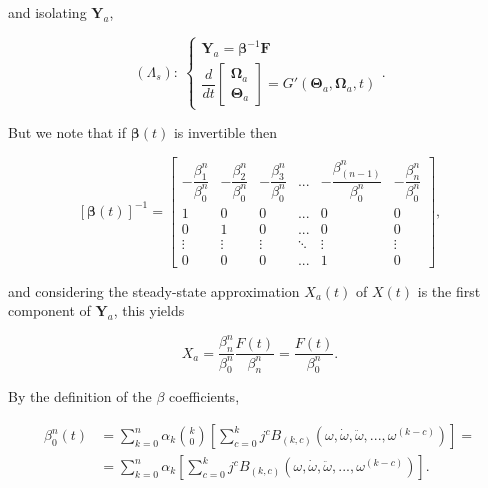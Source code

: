 	\noindent and isolating $\mathbf{Y}_a$,

\begin{equation}
	\left(\Lambda_s\right):\ \left\{\begin{array}{l} 
		\mathbf{Y}_a = \boldsymbol{\beta}^{-1} \mathbf{F} \\[3mm]
		\dfrac{d}{dt}\left[\begin{array}{c} \boldsymbol{\Omega}_a \\[3mm] \boldsymbol{\Theta}_a \end{array}\right] = G'\left(\boldsymbol{\Theta}_a, \boldsymbol{\Omega}_a, t\right)
\end{array} \right. .
\end{equation}

	But we note that if $\boldsymbol{\beta}(t)$ is invertible then

\begin{equation} \left[\boldsymbol{\beta}(t)\right]^{-1} =
\left[\begin{array}{cccccc}
- \dfrac{\beta^n_1}{\beta^n_0} & - \dfrac{\beta^n_2}{\beta^n_0} & -\dfrac{\beta^n_3}{\beta^n_0} & ... & -\dfrac{\beta^n_{(n-1)}}{\beta^n_0} & -\dfrac{\beta^n_n}{\beta^n_0} \\[3mm]
1 & 0 & 0 & ... & 0 & 0 \\[3mm]
0 & 1 & 0 & ... & 0 & 0  \\[3mm]
\vdots & \vdots & \vdots & \ddots & \vdots & \vdots \\[3mm]
0 & 0 & 0 & ... & 1 & 0
\end{array}\right] ,
\end{equation}

	\noindent and considering the steady-state approximation $X_a(t)$ of $X(t)$ is the first component of $\mathbf{Y}_a$, this yields

\begin{equation} X_a = \dfrac{\beta^n_n}{\beta^n_0}\dfrac{F(t)}{\beta^n_n} = \dfrac{F(t)}{\beta_0^n} . \label{eq:qsh_approx_slowsystemresult}\end{equation}

	By the definition of the $\beta$ coefficients,

\begin{align} \beta_0^n(t) &= \sum\limits_{k=0}^{n} \alpha_k{k\choose 0} \left[\sum\limits_{c=0}^{k} j^cB_{\left(k,c\right)}\left(\omega,\dot{\omega},\ddot{\omega},...,\omega^{(k-c)}\right) \right] = \\[3mm] &= \sum\limits_{k=0}^{n} \alpha_k \left[\sum\limits_{c=0}^{k} j^cB_{\left(k,c\right)}\left(\omega,\dot{\omega},\ddot{\omega},...,\omega^{(k-c)}\right) \right]. \label{eq:beta0_approx_tvar}\end{align}

